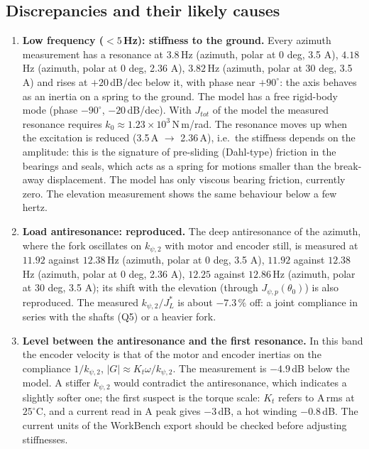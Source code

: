 \documentclass[10pt,a4paper]{article}
\numberwithin{equation}{section}
\begin{document}
\subsection{Discrepancies and their likely causes}\label{subsec:exp_discussion}
\begin{enumerate}
\item \textbf{Low frequency ($<5$\,Hz): stiffness to the ground.} Every azimuth measurement has a resonance at $3.8$\,Hz (azimuth, polar at 0 deg, 3.5 A), $4.18$\,Hz (azimuth, polar at 0 deg, 2.36 A), $3.82$\,Hz (azimuth, polar at 30 deg, 3.5 A) and rises at $+20$\,dB/dec below it, with phase near $+90^\circ$: the axis behaves as an inertia on a spring to the ground. The model has a free rigid-body mode (phase $-90^\circ$, $-20$\,dB/dec). With $J_{tot}$ of the model the measured resonance requires $k_0 \approx 1.23\times10^{3}$\,N\,m/rad. The resonance moves up when the excitation is reduced (3.5\,A $\to$ 2.36\,A), i.e.\ the stiffness depends on the amplitude: this is the signature of pre-sliding (Dahl-type) friction in the bearings and seals, which acts as a spring for motions smaller than the break-away displacement. The model has only viscous bearing friction, currently zero. The elevation measurement shows the same behaviour below a few hertz.
\item \textbf{Load antiresonance: reproduced.} The deep antiresonance of the azimuth, where the fork oscillates on $k_{\psi,2}$ with motor and encoder still, is measured at $11.92$ against $12.38$\,Hz (azimuth, polar at 0 deg, 3.5 A), $11.92$ against $12.38$\,Hz (azimuth, polar at 0 deg, 2.36 A), $12.25$ against $12.86$\,Hz (azimuth, polar at 30 deg, 3.5 A); its shift with the elevation (through $J_{\psi,p}(\theta_0)$) is also reproduced. The measured $k_{\psi,2}/J_L^*$ is about $-7.3\,\%$ off: a joint compliance in series with the shafts (Q5) or a heavier fork.
\item \textbf{Level between the antiresonance and the first resonance.} In this band the encoder velocity is that of the motor and encoder inertias on the compliance $1/k_{\psi,2}$, $|G|\approx K_t\omega/k_{\psi,2}$. The measurement is $-4.9$\,dB below the model. A stiffer $k_{\psi,2}$ would contradict the antiresonance, which indicates a slightly softer one; the first suspect is the torque scale: $K_t$ refers to A\,rms at $25^\circ$C, and a current read in A peak gives $-3$\,dB, a hot winding $-0.8$\,dB. The current units of the WorkBench export should be checked before adjusting stiffnesses.

\end{enumerate}
\end{document}
